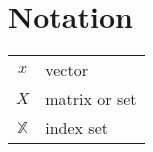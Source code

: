 \chapter*{Notation}

\begin{tabular}{cp{}}
    $x$ & vector \\
    $X$ & matrix or set \\
    $\mathbb{X}$ & index set
\end{tabular}\\

